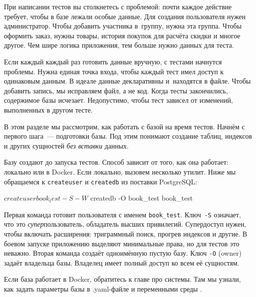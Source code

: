
При написании тестов вы столкнетесь с проблемой: почти каждое действие требует,
чтобы в базе лежали особые данные. Для создания пользователя нужен
администратор. Чтобы добавить участника в~группу, нужна эта группа. Чтобы
оформить заказ, нужны товары, история покупок для расчёта скидки и многое
другое. Чем шире логика приложения, тем больше нужно данных для теста.

Если каждый каждый раз готовить данные вручную, с тестами начнутся
проблемы. Нужна единая точка входа, чтобы каждый тест имел доступ к одинаковым
данным. В идеале данные декларативны и~находятся в файле. Чтобы добавить запись,
мы исправляем файл, а не код. Когда тесты закончились, содержимое базы
исчезает. Недопустимо, чтобы тест зависел от изменений, выполненных в другом
тесте.

В этом разделе мы рассмотрим, как работать с базой на время тестов. Начнём с
первого шага~--- подготовки базы. Под этим понимают создание таблиц, индексов и
других сущностей \emph{без вставки} данных.


Базу создают до запуска тестов. Способ зависит от того, как она работает:
локально или в Docker. Если локально, вызовем несколько утилит. Ниже мы
обращаемся к \verb|createuser| и \verb|createdb| из поставки PostgreSQL:

\begin{english}
  \begin{bash}
$ createuser book_test -S -W
$ createdb -O book_test book_test
  \end{bash}
\end{english}

Первая команда готовит пользователя с именем \verb|book_test|.
Ключ~\verb|-S| означает, что это \emph{супер}пользователь,
обладатель высших привилегий. Супердоступ нужен, чтобы включать расширения:
триграммный поиск, прогрев индексов и другие. В боевом запуске приложению
выделяют минимальные права, но для тестов это неважно. Вторая команда создаёт
одноимённую пустую базу. Ключ \verb|-O| (owner) задаёт владельца
базы. Владелец имеет полный доступ ко всем её сущностям.


Если база работает в Docker, обратитесь к главе про системы. Там мы узнали, как
задать параметры базы в .yaml-файле и переменными среды .


